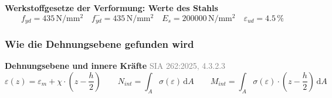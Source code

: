 \documentclass[11pt,a4paper]{article}
\newcommand{\normref}[1]{{\small\textcolor{gray}{#1}}}
\begin{document}
\noindent\textbf{Werkstoffgesetze der Verformung: Werte des Stahls}
\begin{equation*}
f_{yd} = 435\,\mathrm{N}/\mathrm{mm}^{2} \quad f_{yd}^{-} = 435\,\mathrm{N}/\mathrm{mm}^{2} \quad E_s = 200000\,\mathrm{N}/\mathrm{mm}^{2} \quad \varepsilon_{ud} = 4.5\,\%
\end{equation*}
\subsubsection{Wie die Dehnungsebene gefunden wird}
\noindent\textbf{Dehnungsebene und innere Kräfte} \hfill \normref{SIA 262:2025, 4.3.2.3}
\begin{equation*}
\varepsilon(z) = \varepsilon_m + \chi \cdot \left(z - \frac{h}{2}\right) \qquad N_{int} = \int_A \sigma\left(\varepsilon\right)\,\mathrm{d}A \qquad M_{int} = \int_A \sigma\left(\varepsilon\right) \cdot \left(z - \frac{h}{2}\right)\,\mathrm{d}A
\end{equation*}
\end{document}

